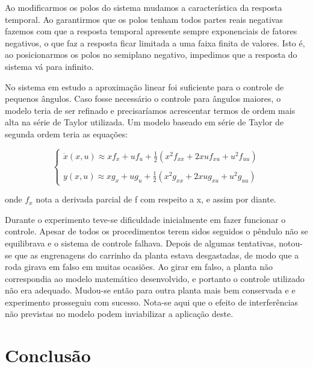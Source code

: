 \documentclass[journal]{IEEEtran}
\begin{document}
Ao modificarmos os polos do sistema mudamos a característica da 
resposta temporal. Ao garantirmos que os polos tenham todos partes
reais negativas fazemos com que a resposta temporal apresente 
sempre exponenciais de fatores negativos, o que faz a resposta 
ficar limitada a uma faixa finita de valores. Isto é, ao posicionarmos
os polos no semiplano negativo, impedimos que a resposta do sistema 
vá para infinito.


No sistema em estudo a aproximação linear foi suficiente para o 
controle de pequenos ângulos. Caso fosse necessário o controle para
ângulos maiores, o modelo teria de ser refinado e precisaríamos 
acrescentar termos de ordem mais alta na série de Taylor utilizada.
Um modelo baseado em série de Taylor de segunda ordem teria as 
equações:

\begin{equation}
 \left\{
      \begin{array}{l}
       \dot{x}(x, u) \approx xf_x + uf_u + \frac{1}{2}(x^2 
f_{xx} + 2xuf_{xu} + u^2f_{uu})  \\ \\
       y(x, u) \approx xg_x + ug_u + \frac{1}{2}(x^2 
g_{xx} + 2xug_{xu} + u^2g_{uu}) 
      \end{array}
 \right.
\end{equation}

onde $f_x$ nota a derivada parcial de f com respeito a x, e assim 
por diante.

Durante o experimento teve-se dificuldade inicialmente em fazer 
funcionar o controle. Apesar de todos os procedimentos terem sidos 
seguidos o pêndulo não se equilibrava e o sistema de controle falhava.
Depois de algumas tentativas, notou-se que as engrenagens do carrinho
da planta estava desgastadas, de modo que a roda girava em falso em 
muitas ocasiões. Ao girar em falso, a planta não correspondia ao 
modelo matemático desenvolvido, e portanto o controle utilizado não
era adequado. Mudou-se então para outra planta mais bem conservada e 
e experimento prosseguiu com sucesso. Nota-se aqui que o efeito de 
interferências não previstas no modelo podem inviabilizar a aplicação
deste.


\section{Conclusão}
\end{document}
